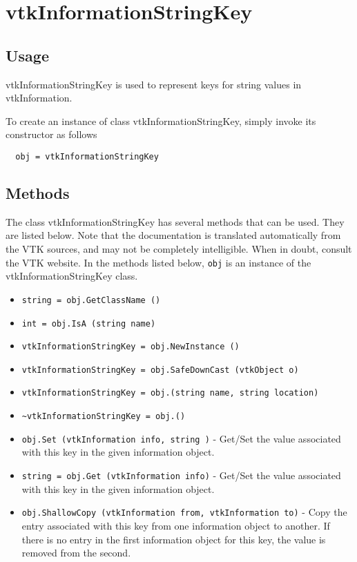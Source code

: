 \section{vtkInformationStringKey}

\subsection{Usage}

 vtkInformationStringKey is used to represent keys for string values
 in vtkInformation.

To create an instance of class vtkInformationStringKey, simply
invoke its constructor as follows
\begin{verbatim}
  obj = vtkInformationStringKey
\end{verbatim}
\subsection{Methods}

The class vtkInformationStringKey has several methods that can be used.
  They are listed below.
Note that the documentation is translated automatically from the VTK sources,
and may not be completely intelligible.  When in doubt, consult the VTK website.
In the methods listed below, \verb|obj| is an instance of the vtkInformationStringKey class.
\begin{itemize}
\item  \verb|string = obj.GetClassName ()|

\item  \verb|int = obj.IsA (string name)|

\item  \verb|vtkInformationStringKey = obj.NewInstance ()|

\item  \verb|vtkInformationStringKey = obj.SafeDownCast (vtkObject o)|

\item  \verb|vtkInformationStringKey = obj.(string name, string location)|

\item  \verb|~vtkInformationStringKey = obj.()|

\item  \verb|obj.Set (vtkInformation info, string )| -  Get/Set the value associated with this key in the given
 information object.

\item  \verb|string = obj.Get (vtkInformation info)| -  Get/Set the value associated with this key in the given
 information object.

\item  \verb|obj.ShallowCopy (vtkInformation from, vtkInformation to)| -  Copy the entry associated with this key from one information
 object to another.  If there is no entry in the first information
 object for this key, the value is removed from the second.

\end{itemize}
